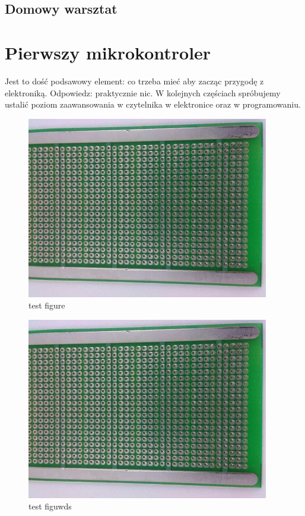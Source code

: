 	\subsection {Domowy warsztat}
    
       
        

\section{Pierwszy mikrokontroler}
		Jest to dość podsawowy element: co trzeba mieć aby zacząc przygodę z elektroniką. Odpowiedz: praktycznie nic. W kolejnych częściach spróbujemy ustalić poziom zaawansowania w czytelnika w elektronice oraz w programowaniu.
\begin{figure}[htb]
  \centering
  \includegraphics[scale=0.1,right]{universe.jpg}
  \caption{test figure}
  \label{fig:test}
\end{figure}
\begin{figure}[!h]
  \centering
  \includegraphics[scale=0.1,left]{universe.jpg}
  \caption{test figuwds}
  \label{fig:test}
\end{figure}

